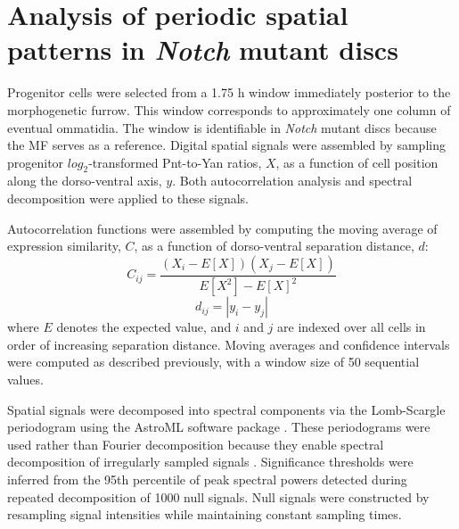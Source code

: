 \section{Analysis of periodic spatial patterns in \textit{Notch} mutant discs}
\label{appendix:ratio:autocorrelation}

Progenitor cells were selected from a 1.75 h window immediately posterior to the morphogenetic furrow. This window corresponds to approximately one column of eventual ommatidia. The window is identifiable in \textit{Notch} mutant discs because the MF serves as a reference. Digital spatial signals were assembled by sampling progenitor $log_2$-transformed Pnt-to-Yan ratios, $X$, as a function of cell position along the dorso-ventral axis, $y$. Both autocorrelation analysis and spectral decomposition were applied to these signals.

Autocorrelation functions were assembled by computing the moving average of expression similarity, $C$, as a function of dorso-ventral separation distance, $d$:
\begin{equation}
C_{ij} = \frac{ (X_i-E[X])(X_j-E[X]) }{ E[X^2] - E[X]^2 }
\end{equation}
\begin{equation}
d_{ij} = | y_i - y_j |
\end{equation}
where $E$ denotes the expected value, and $i$ and $j$ are indexed over all cells in order of increasing separation distance. Moving averages and confidence intervals were computed as described previously, with a window size of 50 sequential values.

Spatial signals were decomposed into spectral components via the Lomb-Scargle periodogram using the AstroML software package \cite{VanderPlas2012}. These periodograms were used rather than Fourier decomposition because they enable spectral decomposition of irregularly sampled signals \cite{VanderPlas2018}. Significance thresholds were inferred from the 95th percentile of peak spectral powers detected during repeated decomposition of 1000 null signals. Null signals were constructed by resampling signal intensities while maintaining constant sampling times.
